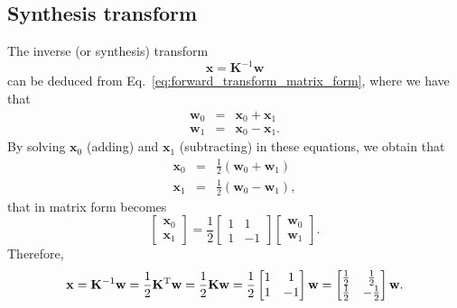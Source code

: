 \subsection{Synthesis transform}
The inverse (or synthesis) transform
\begin{equation}
  {\mathbf x} = {\mathbf K}^{-1}{\mathbf w}
  \label{eq:inverse_transform}
\end{equation}
can be deduced from Eq.~\eqref{eq:forward_transform_matrix_form}, where we have that
\begin{equation}
  \begin{array}{rcl}
  {\mathbf w}_0 & = & {\mathbf x}_0 + {\mathbf x}_1\\
  {\mathbf w}_1 & = & {\mathbf x}_0 - {\mathbf x}_1.
  \end{array}
\end{equation}
By solving ${\mathbf x}_0$ (adding) and ${\mathbf x}_1$ (subtracting) in
these equations, we obtain that
\begin{equation}
  \begin{array}{rcl}
  {\mathbf x}_0 & = & \frac{1}{2}({\mathbf w}_0 + {\mathbf w}_1)\\
  {\mathbf x}_1 & = & \frac{1}{2}({\mathbf w}_0 - {\mathbf w}_1),
  \end{array}
\end{equation}
that in matrix form becomes
\begin{equation}
  \begin{bmatrix}
    {\mathbf x}_0 \\
    {\mathbf x}_1
  \end{bmatrix}
  = \frac{1}{2}
  \begin{bmatrix} 1 & 1 \\ 1 & -1 \end{bmatrix}
  \begin{bmatrix}
    {\mathbf w}_0 \\
    {\mathbf w}_1
  \end{bmatrix}.
\end{equation}
Therefore,
\begin{equation}
  {\mathbf x} = {\mathbf K}^{-1}{\mathbf w} = \frac{1}{2}{\mathbf K}^{\text T}{\mathbf w} = \frac{1}{2}{\mathbf K}{\mathbf w} = \frac{1}{2}\begin{bmatrix} 1 & 1 \\ 1 & -1 \end{bmatrix}{\mathbf w} = \begin{bmatrix} \frac{1}{2} & \frac{1}{2} \\ \frac{1}{2} & -\frac{1}{2} \end{bmatrix}{\mathbf w}.
  \label{eq:inverse_transform_matrix_form}
\end{equation}

